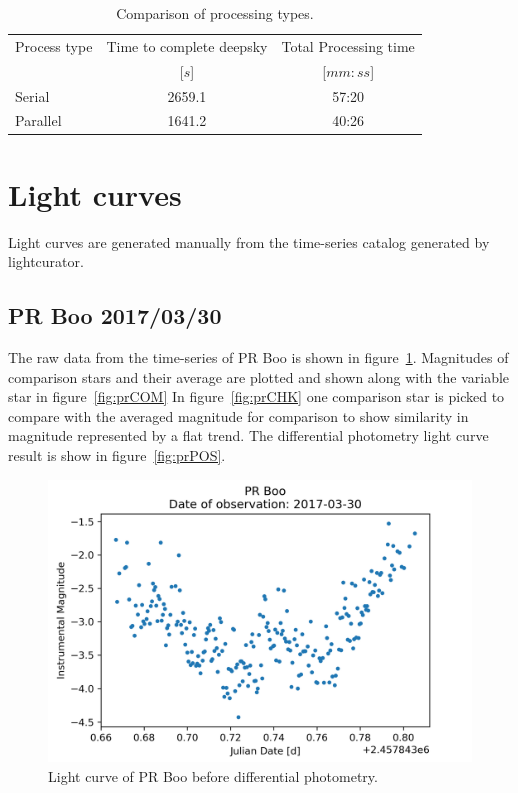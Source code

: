 \begin{table}
    \centering
    \begin{tabular}{l c c}
        \toprule
      Process type  & Time to complete deepsky     & Total Processing time\\
      &   [$s$]   &   [$mm:ss$]\\ \bottomrule
      Serial    & 2659.1 & 57:20\\ \midrule
      Parallel  & 1641.2 & 40:26\\
        \bottomrule
    \end{tabular}
    \caption{Comparison of processing types.}
\label{tab:benchmark}
\end{table}

\section{Light curves}
Light curves are generated manually from the time-series catalog generated by lightcurator.

\subsection{PR Boo 2017/03/30}
The raw data from the time-series of PR Boo is shown in figure~\ref{fig:prRAW}.
Magnitudes of comparison stars and their average are plotted and shown along with the variable star in figure~\ref{fig:prCOM}
In figure~\ref{fig:prCHK} one comparison star is picked to compare with the averaged magnitude for comparison to show similarity
in magnitude represented by a flat trend.
The differential photometry light curve result is show in figure~\ref{fig:prPOS}. 

\begin{figure}[h]
    \centering
    \includegraphics{figures/prboo170330RAW.png}
    \caption{Light curve of PR Boo before differential photometry.}
\label{fig:prRAW}
\end{figure}

